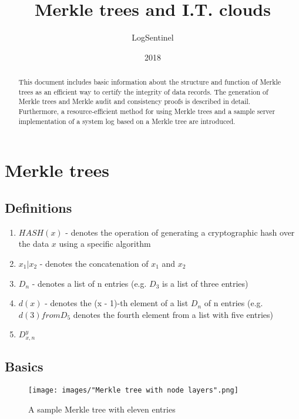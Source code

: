 \documentclass{article}
\title{Merkle trees and I.T. clouds}
\author{LogSentinel}
\date{2018}
\begin{document}
\maketitle

\begin{abstract}
	This document includes basic information about the structure and function of Merkle trees as an efficient way to certify the integrity of data records. The generation of Merkle trees and Merkle audit and consistency proofs is described in detail. Furthermore, a resource-efficient method for using Merkle trees and a sample server implementation of a system log based on a Merkle tree are introduced.
\end{abstract}

\tableofcontents 

\section{Merkle trees}
	
	\subsection{Definitions}
		\begin{enumerate}
			\item $ HASH(x) $ - denotes the operation of generating a cryptographic hash over the data $ x $ using a specific algorithm
			\item $ x_{1} | x_{2} $ - denotes the concatenation of $ x_{1} $ and $ x_{2} $
			\item $ D_{n} $ - denotes a list of n entries (e.g. $ D_{3} $ is a list of three entries)
			\item $ d(x) $ - denotes the (x - 1)-th element of a list $ D_{n} $ of n entries (e.g. $ d(3) from D_{5} $ denotes the fourth element from a list with five entries)
			\item $ D_{x, n}^{y} $
		\end{enumerate}
	
	\subsection{Basics}
	
	\begin{figure}[H]
		\caption{A sample Merkle tree with eleven entries}
		\texttt{[image: images/"Merkle tree with node layers".png]}
	\end{figure}
	
\end{document}
